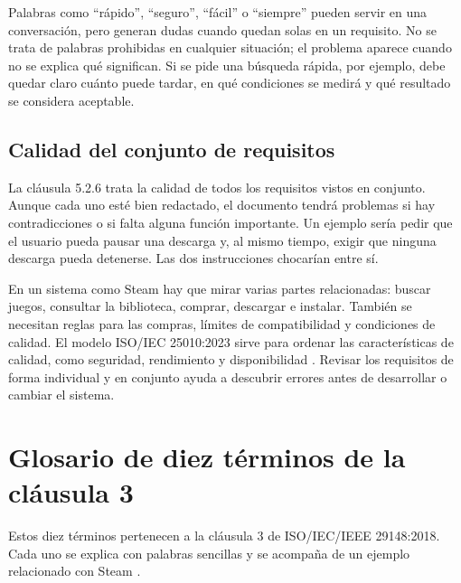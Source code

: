 \documentclass[12pt,a4paper]{article}
\begin{document}
Palabras como ``rápido'', ``seguro'', ``fácil'' o ``siempre'' pueden servir en una conversación, pero generan dudas cuando quedan solas en un requisito. No se trata de palabras prohibidas en cualquier situación; el problema aparece cuando no se explica qué significan. Si se pide una búsqueda rápida, por ejemplo, debe quedar claro cuánto puede tardar, en qué condiciones se medirá y qué resultado se considera aceptable.

\subsection*{Calidad del conjunto de requisitos}

La cláusula 5.2.6 trata la calidad de todos los requisitos vistos en conjunto. Aunque cada uno esté bien redactado, el documento tendrá problemas si hay contradicciones o si falta alguna función importante. Un ejemplo sería pedir que el usuario pueda pausar una descarga y, al mismo tiempo, exigir que ninguna descarga pueda detenerse. Las dos instrucciones chocarían entre sí.

En un sistema como Steam hay que mirar varias partes relacionadas: buscar juegos, consultar la biblioteca, comprar, descargar e instalar. También se necesitan reglas para las compras, límites de compatibilidad y condiciones de calidad. El modelo ISO/IEC 25010:2023 sirve para ordenar las características de calidad, como seguridad, rendimiento y disponibilidad \cite{iso25010}. Revisar los requisitos de forma individual y en conjunto ayuda a descubrir errores antes de desarrollar o cambiar el sistema.

\clearpage
\section{Glosario de diez términos de la cláusula 3}

Estos diez términos pertenecen a la cláusula 3 de ISO/IEC/IEEE 29148:2018. Cada uno se explica con palabras sencillas y se acompaña de un ejemplo relacionado con Steam \cite{iso29148}.
\end{document}
